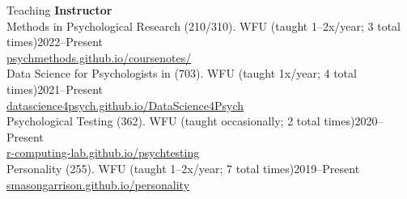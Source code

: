 \begin{rSection}{\textrm{Teaching}}
\vspace*{2pt}
{\large  \bf Instructor}\\
Methods in Psychological Research (210/310). WFU {\small(taught 1--2x/year; 3 total times)}\hfill{2022--Present}\\
\hspace*{6 mm} \href{https://psychmethods.github.io/coursenotes/}{\color{blue} psychmethods.github.io/coursenotes/}\smallskip\\
Data Science for Psychologists in \R (703). WFU {\small(taught 1x/year; 4 total times)}\hfill{2021--Present}\\
\hspace*{6 mm} \href{https://datascience4psych.github.io/DataScience4Psych/}{\color{blue} datascience4psych.github.io/DataScience4Psych}\smallskip\\
Psychological Testing (362). WFU {\small(taught occasionally; 2 total times)}\hfill{2020--Present}\\
\hspace*{6 mm} \href{https://r-computing-lab.github.io/psychtesting/}{\color{blue} r-computing-lab.github.io/psychtesting}\smallskip\\
Personality (255). WFU  {\small(taught 1--2x/year; 7 total times)}\hfill{2019--Present}\\
\hspace*{6 mm} \href{https://smasongarrison.github.io/personality/}{\color{blue} smasongarrison.github.io/personality} \smallskip\\
\begin{comment}
Methods in Psychological Research (210/310). Wake Forest University \hfill{Spring 2022; Fall 2024, \textit{Fall 2025}}\\
Data Science for Psychologists in \R (703). Wake Forest University\hfill{Spring 2023\textsuperscript{*}, Spring 2025}

\end{comment}
\end{rSection}
